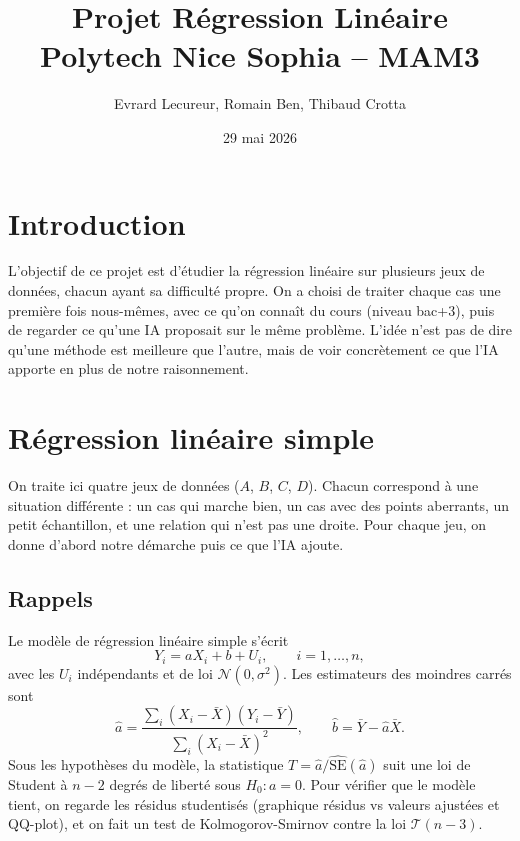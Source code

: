 \documentclass[11pt,a4paper]{article}
\title{Projet Régression Linéaire \\ \large Polytech Nice Sophia -- MAM3}
\author{Evrard Lecureur, Romain Ben, Thibaud Crotta}
\date{29 mai 2026}
\begin{document}
\maketitle

\section*{Introduction}
L'objectif de ce projet est d'étudier la régression linéaire sur plusieurs jeux de données, chacun ayant sa difficulté propre. On a choisi de traiter chaque cas une première fois nous-mêmes, avec ce qu'on connaît du cours (niveau bac+3), puis de regarder ce qu'une IA proposait sur le même problème. L'idée n'est pas de dire qu'une méthode est meilleure que l'autre, mais de voir concrètement ce que l'IA apporte en plus de notre raisonnement.

\tableofcontents

\newpage

\section{Régression linéaire simple}

On traite ici quatre jeux de données ($A$, $B$, $C$, $D$). Chacun correspond à une situation différente : un cas qui marche bien, un cas avec des points aberrants, un petit échantillon, et une relation qui n'est pas une droite. Pour chaque jeu, on donne d'abord notre démarche puis ce que l'IA ajoute.

\subsection{Rappels}

Le modèle de régression linéaire simple s'écrit
\[
Y_i = a X_i + b + U_i, \qquad i = 1, \dots, n,
\]
avec les $U_i$ indépendants et de loi $\mathcal{N}(0, \sigma^2)$. Les estimateurs des moindres carrés sont
\[
\hat{a} = \frac{\sum_{i} (X_i - \bar{X})(Y_i - \bar{Y})}{\sum_{i} (X_i - \bar{X})^2}, \qquad \hat{b} = \bar{Y} - \hat{a}\bar{X}.
\]
Sous les hypothèses du modèle, la statistique $T = \hat{a}/\widehat{\mathrm{SE}}(\hat{a})$ suit une loi de Student à $n-2$ degrés de liberté sous $H_0 : a = 0$. Pour vérifier que le modèle tient, on regarde les résidus studentisés (graphique résidus vs valeurs ajustées et QQ-plot), et on fait un test de Kolmogorov-Smirnov contre la loi $\mathcal{T}(n-3)$.
\end{document}
